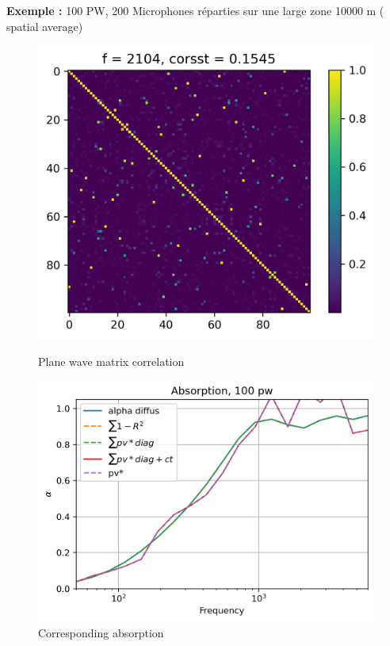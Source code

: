 \documentclass[
a4paper, %
12pt, %
]{SourcesTemplate/TemplateReport}
\begin{document}
\textbf{Exemple : }100 PW, 200 Microphones réparties sur une large zone 10000 m ( spatial average)\\

\begin{figure}[h!]
	\captionsetup{width=0.45\textwidth}
	\begin{minipage}[c]{.45\linewidth}
		\begin{center}
			\includegraphics[width=0.9\linewidth]{images/cross5}
			\caption*{Plane wave matrix correlation}
		\end{center}
	\end{minipage}
	\hfill
	\begin{minipage}[c]{.45\linewidth}
		\begin{center}
			\includegraphics[width=0.9\linewidth]{images/cross6}
			\caption*{Corresponding absorption}
		\end{center}
	\end{minipage}
\end{figure}	
\end{document}
